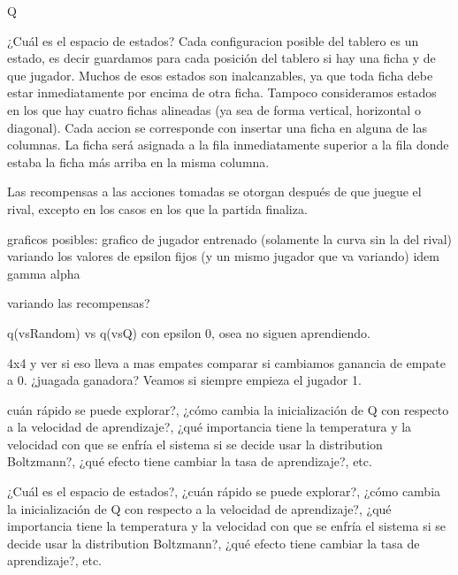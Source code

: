 \documentclass[10pt, a4paper]{article}
\begin{document}
Q

¿Cuál es el espacio de estados?
Cada configuracion posible del tablero es un estado, es decir guardamos para cada posición del tablero si hay una ficha y de que jugador. Muchos de esos estados son inalcanzables, ya que toda ficha debe estar inmediatamente por encima de otra ficha. Tampoco consideramos estados en los que hay cuatro fichas alineadas (ya sea de forma vertical, horizontal o diagonal). 
Cada accion se corresponde con insertar una ficha en alguna de las columnas. La ficha será asignada a la fila inmediatamente superior a la fila donde estaba la ficha más arriba en la misma columna.

Las recompensas a las acciones tomadas se otorgan después de que juegue el rival, excepto en los casos en los que la partida finaliza.

graficos posibles:
grafico de jugador entrenado (solamente la curva sin la del rival) variando los valores de epsilon fijos (y un mismo jugador que va variando)
idem gamma
alpha

variando las recompensas?

q(vsRandom) vs q(vsQ) con epsilon 0, osea no siguen aprendiendo.


4x4 y ver si eso lleva a  mas empates
comparar si cambiamos ganancia de empate a 0.
¿juagada ganadora? Veamos si siempre empieza el jugador 1.


cuán rápido se puede explorar?, ¿cómo cambia la inicialización de Q con respecto a la velocidad de aprendizaje?, ¿qué importancia tiene la temperatura y la velocidad con que se enfría el sistema si se decide usar la distribution Boltzmann?, ¿qué efecto tiene cambiar la tasa de aprendizaje?, etc.


¿Cuál es el espacio de estados?, ¿cuán rápido se puede explorar?, ¿cómo cambia la inicialización de Q con respecto a la velocidad de aprendizaje?, ¿qué importancia tiene la temperatura y la velocidad con que se enfría el sistema si se decide usar la distribution Boltzmann?, ¿qué efecto tiene cambiar la tasa de aprendizaje?, etc.

\end{document}
